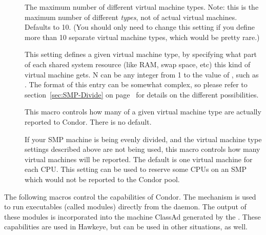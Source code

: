 \begin{description}

\item[]
\label{param:MaxVirtualMachineTypes}
  The maximum number of different virtual machine types.  
  Note: this is the maximum number of different \emph{types}, not of
  actual virtual machines.
  Defaults to 10.  
  (You should only need to change this setting if you define more than
  10 separate virtual machine types, which would be pretty rare.)

\item[]
\label{param:VirtualMachineTypeN}
  This setting defines a given virtual machine type, by specifying
  what part of each shared system resource (like RAM, swap space, etc)
  this kind of virtual machine gets.
  N can be any integer from 1 to the value of
  , such as
  . 
  The format of this entry can be somewhat complex, so please refer to
  section~\ref{sec:SMP-Divide} on page~\pageref{sec:SMP-Divide} for
  details on the different possibilities.

\item[]
\label{param:NumVirtualMachinesTypeN}
  This macro controls how many of a given virtual machine type
  are actually reported to Condor.
  There is no default.

\item[]
\label{param:NumVirtualMachines}
  If your SMP machine is being evenly divided, and the virtual
  machine type settings described above are not being used, this
  macro controls how many virtual machines will be reported.  
  The default is one virtual machine for each CPU.
  This setting can be used to reserve some CPUs on an SMP which would
  not be reported to the Condor pool.

\end{description}

The following macros control the  capabilities of Condor.
The  mechanism is used to run executables (called
modules) directly from the  daemon.
The output of these modules
is incorporated into the machine ClassAd generated by the
.  These capabilities are used in Hawkeye, but can be
used in other situations, as well.

